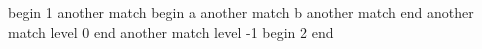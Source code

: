 begin
1
another match
begin
a
another match
b
another match
end
another match level 0
end
another match level -1
begin
2
end
